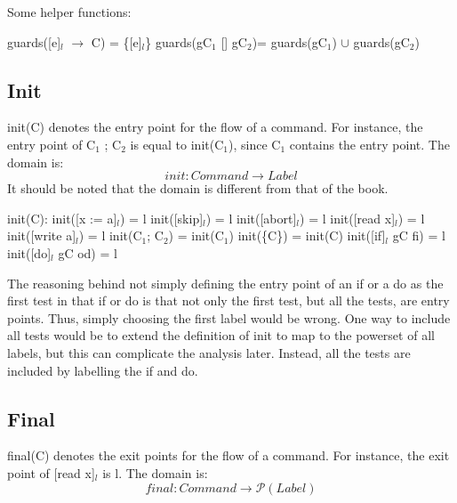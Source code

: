 Some helper functions:

guards([e]$_l$ $\to$ C)      = \{[e]$_l$\} \newline
guards(gC$_1$ [] gC$_2$)= guards(gC$_1$) $\cup$ guards(gC$_2$)\newline

\subsection{Init}

init(C) denotes the entry point for the flow of a command.
For instance, the entry point of C$_1$ ; C$_2$ is equal to init(C$_1$),
since C$_1$ contains the entry point. The domain is:
\[init \colon Command \to Label\]
It should be noted that the domain is different from that of the book.

init(C):\newline
init([x := a]$_l$)      = l\newline
init([skip]$_l$)        = l\newline
init([abort]$_l$)       = l\newline
init([read x]$_l$)      = l\newline
init([write a]$_l$)     = l\newline
init(C$_1$; C$_2$)        = init(C$_1$)\newline
init(\{C\})             = init(C)\newline
init([if]$_l$ gC fi)        = l\newline
init([do]$_l$ gC od)        = l\newline

The reasoning behind not simply defining the entry point of an if or a do as the first
test in that if or do is that not only the first test, but all the tests, are entry points.
Thus, simply choosing the first label would be wrong. One way to include all tests would
be to extend the definition of init to map to the powerset of all labels, but this
can complicate the analysis later. Instead, all the tests are included by labelling
the if and do.



\subsection{Final}

final(C) denotes the exit points for the flow of a command.
For instance, the exit point of [read x]$_l$ is l. The domain is:
\[final \colon Command \to \mathcal{P}(Label)\]


